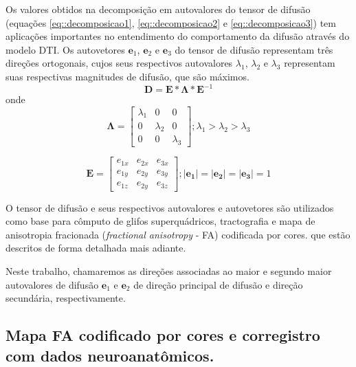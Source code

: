 \documentclass[
    12pt,                %
    oneside,            %
    a4paper,            %
    english,            %
    french,                %
    spanish,            %
    brazil                %
    ]{abntex2}
\begin{document}
Os valores obtidos na decomposição em autovalores do tensor de difusão (equações \ref{eq::decomposicao1}, \ref{eq::decomposicao2} e \ref{eq::decomposicao3}) tem aplicações importantes no entendimento do comportamento da difusão através do modelo DTI. Os autovetores $\mathbf{e}_1$, $\mathbf{e}_2$ e $\mathbf{e}_3$ do tensor de difusão representam três direções ortogonais, cujos seus respectivos autovalores $\lambda_1$, $\lambda_2$ e $\lambda_3$ representam suas respectivas magnitudes de difusão, que são máximos. 
\begin{equation}
\label{eq::decomposicao1}
\mathbf{D} = \mathbf{E}*\mathbf{\Lambda}*\mathbf{E}^{-1}
\end{equation}
onde
\begin{equation}
\label{eq::decomposicao2}
\mathbf{\Lambda} = \begin{bmatrix} 
\lambda_1 & 0 & 0 \\ 
0 & \lambda_2 & 0 \\ 
0 & 0 & \lambda_3  
\end{bmatrix};
\lambda_1 > \lambda_2 > \lambda_3
\end{equation}

\begin{equation}
\label{eq::decomposicao3}
\mathbf{E} = 
\begin{bmatrix} 
e_{1x} & e_{2x} & e_{3x} \\ 
e_{1y} & e_{2y} & e_{3y} \\ 
e_{1z} & e_{2y} & e_{3z}  
\end{bmatrix};
\mathbf{|e_1|} = \mathbf{|e_2|} = \mathbf{|e_3|} = 1
\end{equation}

O tensor de difusão e seus respectivos autovalores e autovetores são utilizados como base para cômputo de glifos superquádricos, tractografia e mapa de anisotropia fracionada (\textit{fractional anisotropy} - FA) codificada por cores. que estão descritos de forma detalhada mais adiante.

Neste trabalho, chamaremos as direções associadas ao maior e segundo maior autovalores de difusão $\mathbf{e}_1$ e $\mathbf{e}_2$ de direção principal de difusão e direção secundária, respectivamente.

\subsection{Mapa FA codificado por cores e corregistro com dados neuroanatômicos.}
\end{document}
